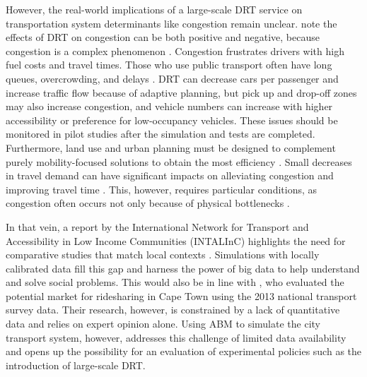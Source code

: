 \documentclass[main.tex]{subfiles}
\begin{document}
However, the real-world implications of a large-scale DRT service on transportation system determinants like congestion remain unclear. \citealp{butler2020smart} note the effects of DRT on congestion can be both positive and negative, because congestion is a complex phenomenon \citep{arnott1994economics}. Congestion frustrates drivers with high fuel costs and travel times. Those who use public transport often have long queues, overcrowding, and delays \citep{jennings2015finding}. DRT can decrease cars per passenger and increase traffic flow because of adaptive planning, but pick up and drop-off zones may also increase congestion, and vehicle numbers can increase with higher accessibility or preference for low-occupancy vehicles. These issues should be monitored in pilot studies after the simulation and tests are completed. Furthermore, land use and urban planning must be designed to complement purely mobility-focused solutions to obtain the most efficiency \citep{jabbarpour2018applications}. Small decreases in travel demand can have significant impacts on alleviating congestion and improving travel time \citep{vickrey1969congestion}. This, however, requires particular conditions, as congestion often occurs not only because of physical bottlenecks \citep{arnott1994economics}. 

In that vein, a report by the International Network for Transport and Accessibility in Low Income Communities (INTALInC) highlights the need for comparative studies that match local contexts \citep{lucas2019transport}. Simulations with locally calibrated data fill this gap and harness the power of big data to help understand and solve social problems. This would also be in line with \citealp{vanderschuren2018ride}, who evaluated the potential market for ridesharing in Cape Town using the 2013 national transport survey data. Their research, however, is constrained by a lack of quantitative data and relies on expert opinion alone. Using ABM to simulate the city transport system, however, addresses this challenge of limited data availability and opens up the possibility for an evaluation of experimental policies such as the introduction of large-scale DRT.  

\end{document}
